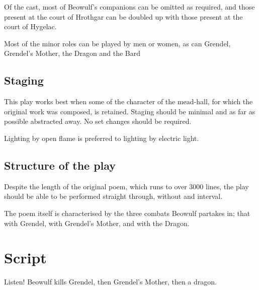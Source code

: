 \documentclass[a4paper]{article}
\begin{document}
Of the cast, most of Beowulf's companions can be omitted as required, and those
present at the court of Hrothgar can be doubled up with those present at the court
of Hygelac. 

Most of the minor roles can be played by men or women, as can Grendel, Grendel's
Mother, the Dragon and the Bard

\subsection{Staging}%

This play works best when some of the character of the mead-hall, for which the
original work was composed, is retained. Staging should be minimal and as far as
possible abstracted away. No set changes should be required.

Lighting by open flame is preferred to lighting by electric light.

\subsection{Structure of the play}%

Despite the length of the original poem, which runs to over 3000 lines, the play
should be able to be performed straight through, without and interval.

The poem itself is characterised by the three combats Beowulf partakes in; that
with Grendel, with Grendel's Mother, and with the Dragon. 

\section{Script}

Listen! Beowulf kills Grendel, then Grendel's Mother, then a dragon. 
\end{document}
